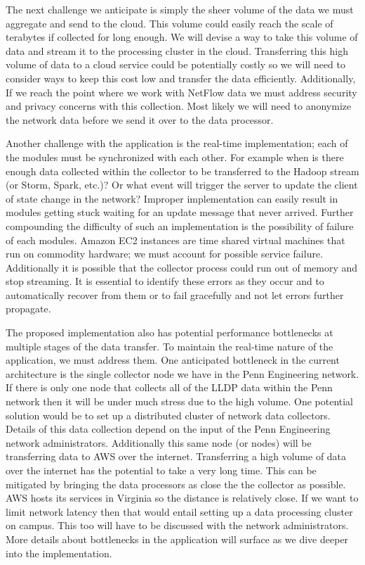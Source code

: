 \documentclass{sig-alternate}
\begin{document}
The next challenge we anticipate is simply the sheer volume of the data we must
aggregate and send to the cloud. This volume could easily reach the scale of
terabytes if collected for long enough. We will devise a way to take this volume
of data and stream it to the processing cluster in the cloud. Transferring this
high volume of data to a cloud service could be potentially costly so we will
need to consider ways to keep this cost low and transfer the data efficiently.
Additionally, If we reach the point where we work with NetFlow data we must
address security and privacy concerns with this collection. Most likely we will
need to anonymize the network data before we send it over to the data processor.

Another challenge with the application is the real-time implementation; each of
the modules must be synchronized with each other. For example when is there
enough data collected within the collector to be transferred to the Hadoop
stream (or Storm, Spark, etc.)? Or what event will trigger the server to update
the client of state change in the network? Improper implementation can easily
result in modules getting stuck waiting for an update message that never
arrived. Further compounding the difficulty of such an implementation is the
possibility of failure of each modules. Amazon EC2 instances are time shared
virtual machines that run on commodity hardware; we must account for possible
service failure. Additionally it is possible that the collector process could
run out of memory and stop streaming. It is essential to identify these errors
as they occur and to automatically recover from them or to fail gracefully and
not let errors further propagate.

The proposed implementation also has potential performance bottlenecks at
multiple stages of the data transfer. To maintain the real-time nature of the
application, we must address them. One anticipated bottleneck in the current
architecture is the single collector node we have in the Penn Engineering
network. If there is only one node that collects all of the LLDP data within the
Penn network then it will be under much stress due to the high volume. One
potential solution would be to set up a distributed cluster of network data
collectors. Details of this data collection depend on the input of the Penn
Engineering network administrators. Additionally this same node (or nodes) will
be transferring data to AWS over the internet. Transferring a high volume of
data over the internet has the potential to take a very long time. This can be
mitigated by bringing the data processors as close the the collector as
possible. AWS hosts its services in Virginia so the distance is relatively
close. If we want to limit network latency then that would entail setting up a
data processing cluster on campus. This too will have to be discussed with the
network administrators. More details about bottlenecks in the application will
surface as we dive deeper into the implementation.
\end{document}
